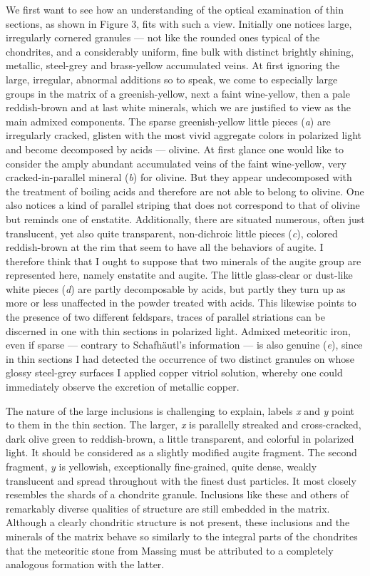 \documentclass[a4paper, 12pt, oneside]{article}
\begin{document}
We first want to see how an understanding of the optical examination of thin sections, as shown in Figure 3, fits with such a view. Initially one notices large, irregularly cornered granules --- not like the rounded ones typical of the chondrites, and a considerably uniform, fine bulk with distinct brightly shining, metallic, steel-grey and brass-yellow accumulated veins. At first ignoring the large, irregular, abnormal additions so to speak, we come to especially large groups in the matrix of a greenish-yellow, next a faint wine-yellow, then a pale reddish-brown and at last white minerals, which we are justified to view as the main admixed components. The sparse greenish-yellow little pieces (\emph{a}) are irregularly cracked, glisten with the most vivid aggregate colors in polarized light and become decomposed by acids --- olivine. At first glance one would like to consider the amply abundant accumulated veins of the faint wine-yellow, very cracked-in-parallel mineral (\emph{b}) for olivine. But they appear undecomposed with the treatment of boiling acids and therefore are not able to belong to olivine. One also notices a kind of parallel striping that does not correspond to that of olivine but reminds one of enstatite. Additionally, there are situated numerous, often just translucent, yet also quite transparent, non-dichroic little pieces (\emph{c}), colored reddish-brown at the rim that seem to have all the behaviors of augite. I therefore think that I ought to suppose that two minerals of the augite group are represented here, namely enstatite and augite. The little glass-clear or dust-like white pieces (\emph{d}) are partly decomposable by acids, but partly they turn up as more or less unaffected in the powder treated with acids. This likewise points to the presence of two different feldspars, traces of parallel striations can be discerned in one with thin sections in polarized light. Admixed meteoritic iron, even if sparse --- contrary to Schafhäutl's information --- is also genuine (\emph{e}), since in thin sections I had detected the occurrence of two distinct granules on whose glossy steel-grey surfaces I applied copper vitriol solution, whereby one could immediately observe the excretion of metallic copper.

The nature of the large inclusions is challenging to explain, labels \emph{x} and \emph{y} point to them in the thin section. The larger, \emph{x} is parallelly streaked and cross-cracked, dark olive green to reddish-brown, a little transparent, and colorful in polarized light. It should be considered as a slightly modified augite fragment. The second fragment, \emph{y} is yellowish, exceptionally fine-grained, quite dense, weakly translucent and spread throughout with the finest dust particles. It most closely resembles the shards of a chondrite granule. Inclusions like these and others of remarkably diverse qualities of structure are still embedded in the matrix. Although a clearly chondritic structure is not present, these inclusions and the minerals of the matrix behave so similarly to the integral parts of the chondrites that the meteoritic stone from Massing must be attributed to a completely analogous formation with the latter.
\end{document}
